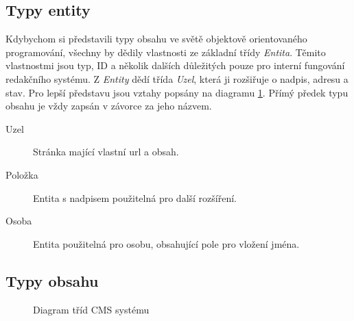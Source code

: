 \subsection{Typy entity}
\label{subsec:typy-entiy}
Kdybychom si představili typy obsahu ve světě objektově orientovaného programování, všechny by dědily vlastnosti ze základní třídy \emph{Entita}. Těmito vlastnostmi jsou typ, ID a několik dalších důležitých pouze pro interní fungování redakčního systému. Z \emph{Entity} dědí třída \emph{Uzel}, která ji rozšiřuje o nadpis, adresu a stav. Pro lepší představu jsou vztahy popsány na diagramu \ref{fig:class-diagram}. Přímý předek typu obsahu je vždy zapsán v závorce za jeho názvem.

\begin{description}
  \item[Uzel] Stránka mající vlastní \gls{url} a obsah.
  \item[Položka] Entita s nadpisem použitelná pro další rozšíření.
  \item[Osoba] Entita použitelná pro osobu, obsahující pole pro vložení jména.
\end{description}

\subsection{Typy obsahu}
\label{subsec:typy-obsahu}

\begin{figure}[htp] 
\caption{Diagram tříd CMS systému}
\label{fig:class-diagram}
\end{figure}  

